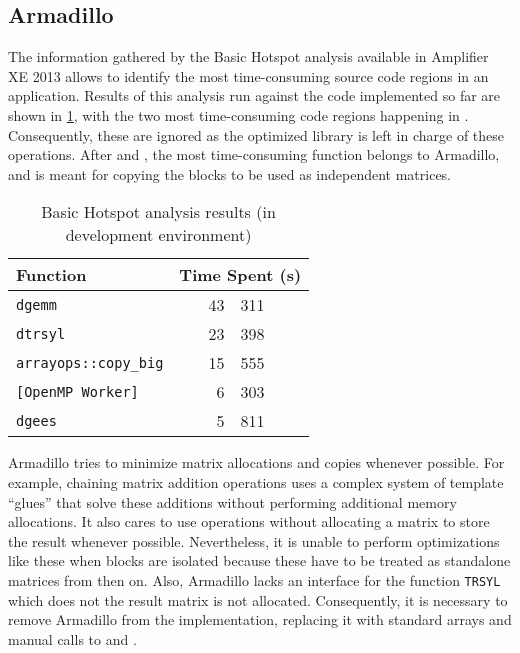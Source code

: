 \documentclass[../thesis]{subfiles}
\begin{document}
	\subsection{Armadillo}
	\label{subsec:mic:optims:arma}

	The information gathered by the Basic Hotspot analysis available in \intel\vtune Amplifier XE 2013 allows to identify the most time-consuming source code regions in an application. Results of this analysis run against the code implemented so far are shown in \cref{tab:hotspots}, with the two most time-consuming code regions happening in \mkl. Consequently, these are ignored as the optimized library is left in charge of these operations. After \blas and \lapack, the most time-consuming function belongs to Armadillo, and is meant for copying the blocks to be used as independent matrices.

	\begin{table}[htp]
		\begin{center}
			\begin{tabular}{l|r@{.}l}
				\hline
				Function & \multicolumn{2}{r}{Time Spent (s)} \\
				\hline
				\texttt{dgemm} & 43 & 311  \\
				\texttt{dtrsyl} & 23 & 398  \\
				\texttt{arrayops::copy\_big} & 15 & 555  \\
				\texttt{[OpenMP Worker]} & 6 & 303  \\
				\texttt{dgees} & 5 & 811  \\
				\hline
			\end{tabular}
		\end{center}
		\caption[Basic Hotspot analysis results]{Basic Hotspot analysis results (in development environment)}
		\label{tab:hotspots}
	\end{table}

	Armadillo tries to minimize matrix allocations and copies whenever possible. For example, chaining matrix addition operations uses a complex system of template ``glues'' that solve these additions without performing additional memory allocations. It also cares to use \blas operations without allocating a matrix to store the result whenever possible. Nevertheless, it is unable to perform optimizations like these when blocks are isolated because these have to be treated as standalone matrices from then on. Also, Armadillo lacks an interface for the \lapack function \texttt{TRSYL} which does not the result matrix is not allocated. Consequently, it is necessary to remove Armadillo from the implementation, replacing it with standard arrays and manual calls to \blas and \lapack.
\end{document}
